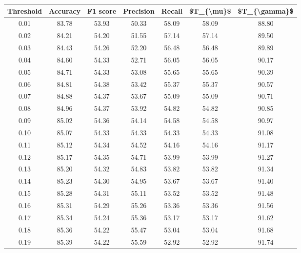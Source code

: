 \begin{tabular}{|c|c|c|c|c|c|c|}
\hline
 Threshold &  Accuracy &  F1 score &  Precision &  Recall &  \$T\_\{\textbackslash mu\}\$ &  \$T\_\{\textbackslash gamma\}\$ \\
\hline
      0.01 &     83.78 &     53.93 &      50.33 &   58.09 &      58.09 &         88.80 \\
      0.02 &     84.21 &     54.20 &      51.55 &   57.14 &      57.14 &         89.50 \\
      0.03 &     84.43 &     54.26 &      52.20 &   56.48 &      56.48 &         89.89 \\
      0.04 &     84.60 &     54.33 &      52.71 &   56.05 &      56.05 &         90.17 \\
      0.05 &     84.71 &     54.33 &      53.08 &   55.65 &      55.65 &         90.39 \\
      0.06 &     84.81 &     54.38 &      53.42 &   55.37 &      55.37 &         90.57 \\
      0.07 &     84.88 &     54.37 &      53.67 &   55.09 &      55.09 &         90.71 \\
      0.08 &     84.96 &     54.37 &      53.92 &   54.82 &      54.82 &         90.85 \\
      0.09 &     85.02 &     54.36 &      54.14 &   54.58 &      54.58 &         90.97 \\
      0.10 &     85.07 &     54.33 &      54.33 &   54.33 &      54.33 &         91.08 \\
      0.11 &     85.12 &     54.34 &      54.52 &   54.16 &      54.16 &         91.17 \\
      0.12 &     85.17 &     54.35 &      54.71 &   53.99 &      53.99 &         91.27 \\
      0.13 &     85.20 &     54.32 &      54.83 &   53.82 &      53.82 &         91.34 \\
      0.14 &     85.23 &     54.30 &      54.95 &   53.67 &      53.67 &         91.40 \\
      0.15 &     85.28 &     54.31 &      55.11 &   53.52 &      53.52 &         91.48 \\
      0.16 &     85.31 &     54.29 &      55.26 &   53.36 &      53.36 &         91.56 \\
      0.17 &     85.34 &     54.24 &      55.36 &   53.17 &      53.17 &         91.62 \\
      0.18 &     85.36 &     54.22 &      55.47 &   53.04 &      53.04 &         91.68 \\
      0.19 &     85.39 &     54.22 &      55.59 &   52.92 &      52.92 &         91.74 \\

\end{tabular}
